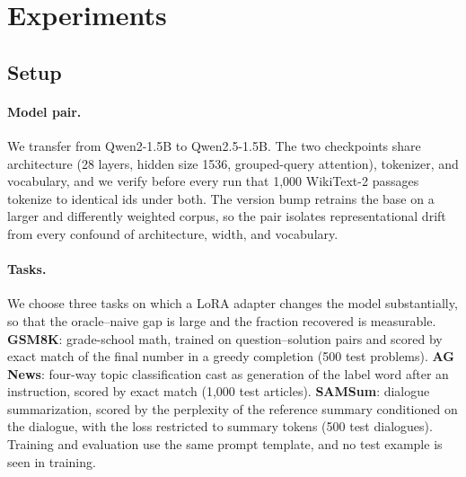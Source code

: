 \section{Experiments}
\label{sec:experiments}


\subsection{Setup}
\label{sec:experiments:setup}

\paragraph{Model pair.}
We transfer from Qwen2-1.5B to Qwen2.5-1.5B. The two checkpoints share
architecture (28 layers, hidden size 1536, grouped-query attention), tokenizer,
and vocabulary, and we verify before every run that 1{,}000 WikiText-2
passages tokenize to identical ids under both. The version bump retrains the
base on a larger and differently weighted corpus, so the pair isolates
representational drift from every confound of architecture, width, and
vocabulary.

\paragraph{Tasks.}
We choose three tasks on which a LoRA adapter changes the model substantially,
so that the oracle--naive gap is large and the fraction recovered is
measurable. \textbf{GSM8K}: grade-school math, trained on question--solution
pairs and scored by exact match of the final number in a greedy completion
(500 test problems). \textbf{AG News}: four-way topic classification cast as
generation of the label word after an instruction, scored by exact match
(1{,}000 test articles). \textbf{SAMSum}: dialogue summarization, scored by
the perplexity of the reference summary conditioned on the dialogue, with the
loss restricted to summary tokens (500 test dialogues). Training and
evaluation use the same prompt template, and no test example is seen in
training.

